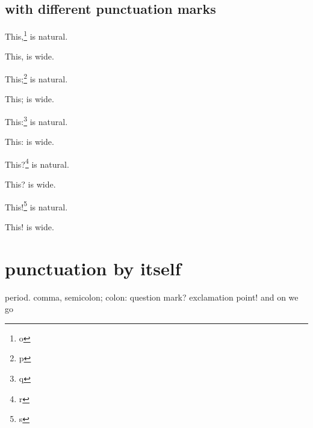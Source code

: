 \documentclass{snapshotmfo}
\begin{document}
\subsection{with different punctuation marks}

\noindent This,\footnote{o} is natural.

\noindent This, is wide.

\noindent This;\footnote{p} is natural.

\noindent This; is wide.

\noindent This:\footnote{q} is natural.

\noindent This: is wide.

\noindent This?\footnote{r} is natural.

\noindent This? is wide.

\noindent This!\footnote{s} is natural.

\noindent This! is wide.



\section{punctuation by itself} 

period. comma, semicolon; colon: question mark? exclamation point! and on we go
\end{document}
